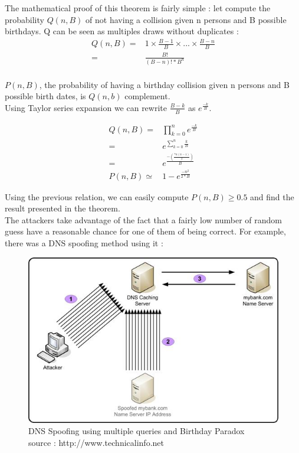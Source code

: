 The mathematical proof of this theorem is fairly simple : let compute the probability $Q(n,B)$ of not having a collision given n persons and B possible birthdays. Q can be seen as multiples draws without duplicates : \\
\begin{align}
    Q(n,B) =& 1 \times \frac{B-1}{B} \times ... \times \frac{B-n}{B} \\
           =& \frac{B!}{(B-n)!*B^n} \\
\end{align}  

$P(n,B)$, the probability of having a birthday collision given n persons and B possible birth dates, is $Q(n,b)$ complement. \\
Using Taylor series expansion we can rewrite $\frac{B-k}{B}$ as $e^{\frac{-k}{B}}$. 

\begin{align}
    Q(n,B) =& \prod_{k = 0}^n e^{\frac{-k}{B}}      \\
           =& e^{\sum_{k = 0}^n \frac{k}{B}}        \\
           =& e^{ \frac{-(\frac{*n(n-1)}{2})}{B} }  \\
    P(n,B) \simeq& 1 - e^{ \frac{-n^2}{2*B} }       
\end{align}  


Using the previous relation, we can easily compute $P(n,B) \geq 0.5$ and find the result presented in the theorem.\\

The attackers take advantage of the fact that a fairly low number of random guess have a reasonable chance for one of them of being correct. For example, there was a DNS spoofing method using it : \\

\begin{figure}[ht!]
    \centering
       \includegraphics[width=\textwidth]{images/dns_spoofing_birthday.jpg}
	\caption{DNS Spoofing using multiple queries and Birthday Paradox \\ source : http://www.technicalinfo.net}
	\label{fig:DNSSpoofingBirthday}
\end{figure}

